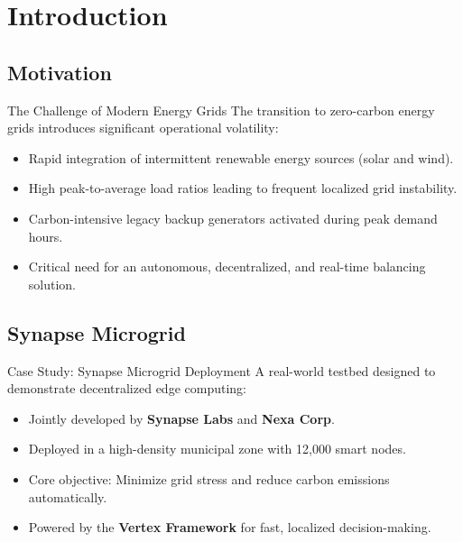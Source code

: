 \section{Introduction}
\subsection{Motivation}

\begin{frame}{The Challenge of Modern Energy Grids}
  The transition to zero-carbon energy grids introduces significant operational volatility:
  \vspace{0.4cm}
  \begin{itemize}
    \item<1-> Rapid integration of intermittent renewable energy sources (solar and wind).
    \item<2-> High peak-to-average load ratios leading to frequent localized grid instability.
    \item<3-> Carbon-intensive legacy backup generators activated during peak demand hours.
    \item<4-> Critical need for an autonomous, decentralized, and real-time balancing solution.
  \end{itemize}
\end{frame}

\subsection{Synapse Microgrid}

\begin{frame}{Case Study: Synapse Microgrid Deployment}
  A real-world testbed designed to demonstrate decentralized edge computing:
  \vspace{0.4cm}
  \begin{itemize}
    \item Jointly developed by \textbf{Synapse Labs} and \textbf{Nexa Corp}.
    \item Deployed in a high-density municipal zone with 12,000 smart nodes.
    \item Core objective: Minimize grid stress and reduce carbon emissions automatically.
    \item Powered by the \textbf{Vertex Framework} for fast, localized decision-making.
  \end{itemize}
\end{frame}
